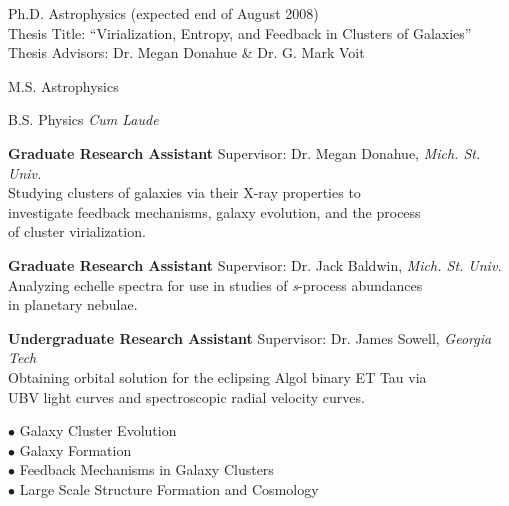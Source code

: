 \documentclass[11pt]{cv}
\begin{document}
\begin{llist}


Ph.D. Astrophysics (expected end of August 2008)\\
Thesis Title: ``Virialization, Entropy, and Feedback in Clusters of Galaxies''\\
Thesis Advisors: Dr. Megan Donahue \& Dr. G. Mark Voit

M.S. Astrophysics

B.S. Physics {\it Cum Laude}


{\sc \bf{Graduate Research Assistant}}
Supervisor: Dr. Megan Donahue, {\textit{Mich. St. Univ.}}\\
Studying clusters of galaxies via their X-ray properties to\\
investigate feedback mechanisms, galaxy evolution, and the process\\
of cluster virialization.

{\sc \bf{Graduate Research Assistant}}
Supervisor: Dr. Jack Baldwin, {\textit{Mich. St. Univ.}}\\
Analyzing echelle spectra for use in studies of {\textit{s}}-process abundances\\
in planetary nebulae.

{\sc \bf{Undergraduate Research Assistant}}
Supervisor: Dr. James Sowell, {\textit{Georgia Tech}}\\
Obtaining orbital solution for the eclipsing Algol binary ET Tau via\\
UBV light curves and spectroscopic radial velocity curves.


{\sc $\bullet$ Galaxy Cluster Evolution}\\
{\sc $\bullet$ Galaxy Formation}\\
{\sc $\bullet$ Feedback Mechanisms in Galaxy Clusters}\\
{\sc $\bullet$ Large Scale Structure Formation and Cosmology}


\end{llist}
\end{document}
